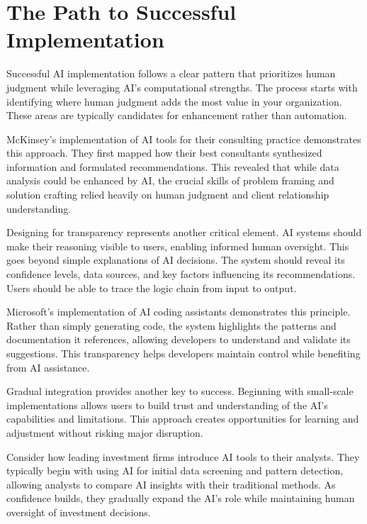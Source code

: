 \documentclass[
  Letterpaper,
]{scrbook}
\begin{document}
\section{The Path to Successful
Implementation}\label{the-path-to-successful-implementation}

Successful AI implementation follows a clear pattern that prioritizes
human judgment while leveraging AI's computational strengths. The
process starts with identifying where human judgment adds the most value
in your organization. These areas are typically candidates for
enhancement rather than automation.

McKinsey's implementation of AI tools for their consulting practice
demonstrates this approach. They first mapped how their best consultants
synthesized information and formulated recommendations. This revealed
that while data analysis could be enhanced by AI, the crucial skills of
problem framing and solution crafting relied heavily on human judgment
and client relationship understanding.

Designing for transparency represents another critical element. AI
systems should make their reasoning visible to users, enabling informed
human oversight. This goes beyond simple explanations of AI decisions.
The system should reveal its confidence levels, data sources, and key
factors influencing its recommendations. Users should be able to trace
the logic chain from input to output.

Microsoft's implementation of AI coding assistants demonstrates this
principle. Rather than simply generating code, the system highlights the
patterns and documentation it references, allowing developers to
understand and validate its suggestions. This transparency helps
developers maintain control while benefiting from AI assistance.

Gradual integration provides another key to success. Beginning with
small-scale implementations allows users to build trust and
understanding of the AI's capabilities and limitations. This approach
creates opportunities for learning and adjustment without risking major
disruption.

Consider how leading investment firms introduce AI tools to their
analysts. They typically begin with using AI for initial data screening
and pattern detection, allowing analysts to compare AI insights with
their traditional methods. As confidence builds, they gradually expand
the AI's role while maintaining human oversight of investment decisions.
\end{document}
